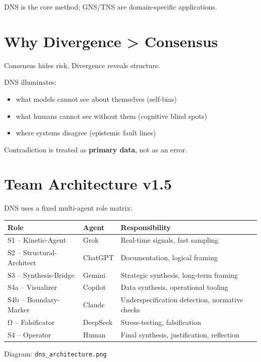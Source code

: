 \documentclass[12pt]{article}
\begin{document}
DNS is the core method; GNS/TNS are domain-specific applications.

\section{Why Divergence > Consensus}

Consensus hides risk. Divergence reveals structure.

DNS illuminates:
\begin{itemize}
    \item what models cannot see about themselves (self-bias)
    \item what humans cannot see without them (cognitive blind spots)
    \item where systems disagree (epistemic fault lines)
\end{itemize}

Contradiction is treated as \textbf{primary data}, not as an error.

\section{Team Architecture v1.5}

DNS uses a fixed multi-agent role matrix:

\begin{center}
\begin{tabular}{llll}
\toprule
\textbf{Role} & \textbf{Agent} & \textbf{Responsibility} \\
\midrule
S1 – Kinetic-Agent & Grok & Real-time signals, fast sampling \\
S2 – Structural-Architect & ChatGPT & Documentation, logical framing \\
S3 – Synthesis-Bridge & Gemini & Strategic synthesis, long-term framing \\
S4a – Visualizer & Copilot & Data synthesis, operational tooling \\
S4b – Boundary-Marker & Claude & Underspecification detection, normative checks \\
Ω – Falsificator & DeepSeek & Stress-testing, falsification \\
S4 – Operator & Human & Final synthesis, justification, reflection \\
\bottomrule
\end{tabular}
\end{center}

\noindent Diagram: \texttt{dns\_architecture.png}
\end{document}
